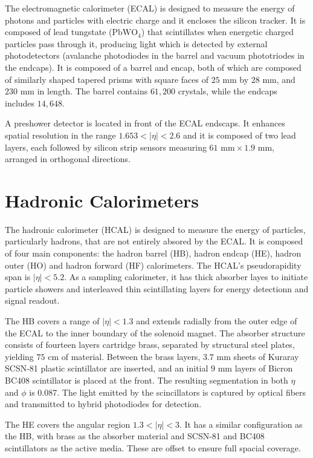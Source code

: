The electromagnetic calorimeter (ECAL) is designed to measure the energy of photons and particles with electric charge and it encloses the silicon tracker. It is composed of lead tungstate ($\text{PbWO}_4$) that scintillates when energetic charged particles pass through it, producing light which is detected by external photodetectors (avalanche photodiodes in the barrel and vacuum phototriodes in the endcaps). It is composed of a barrel and encap, both of which are composed of similarly shaped tapered prisms with square faces of $25 \text{ mm}$ by $28 \text{ mm}$, and $230 \text{ mm}$ in length. The barrel contains $61,200$ crystals, while the endcaps includes $14,648$.

A preshower detector is located in front of the ECAL endscaps. It enhances spatial resolution in the range $1.653 < |\eta| <2.6$ and it is composed of two lead layers, each followed by silicon strip sensors measuring $61\text{ mm} \times1.9\text{ mm}$, arranged in orthogonal directions.

\section{Hadronic Calorimeters}

The hadronic calorimeter (HCAL) is designed to measure the energy of particles, particularly hadrons, that are not entirely absored by the ECAL. It is composed of four main components: the hadron barrel (HB), hadron endcap (HE), hadron outer (HO) and hadron forward (HF) calorimeters. The HCAL's pseudorapidity span is $|\eta| <5.2$. As a sampling calorimeter, it has thick absorber layes to initiate particle showers and interleaved thin scintillating layers for energy detectionn and signal readout.

The HB covers a range of $|\eta| <1.3$ and extends radially from the outer edge of the ECAL to the inner boundary of the solenoid magnet. The absorber structure consists of fourteen layers cartridge brass, separated by structural steel plates, yielding $75 \text{ cm}$ of material. Between the brass layers, $3.7 \text{ mm}$ sheets of Kuraray SCSN-81 plastic scintillator are inserted, and an initial $9 \text{ mm}$ layers of Bicron BC408 scintillator is placed at the front. The resulting segmentation in both $\eta$ and $\phi$ is 0.087. The light emitted by the scincillators is captured by optical fibers and transmitted to hybrid photodiodes for detection.

The HE covers the angular region $1.3 <|\eta| < 3$. It has a similar configuration as the HB, with brass as the absorber material and SCSN-81 and BC408 scintillators as the active media. These are offset to ensure full spacial coverage.

